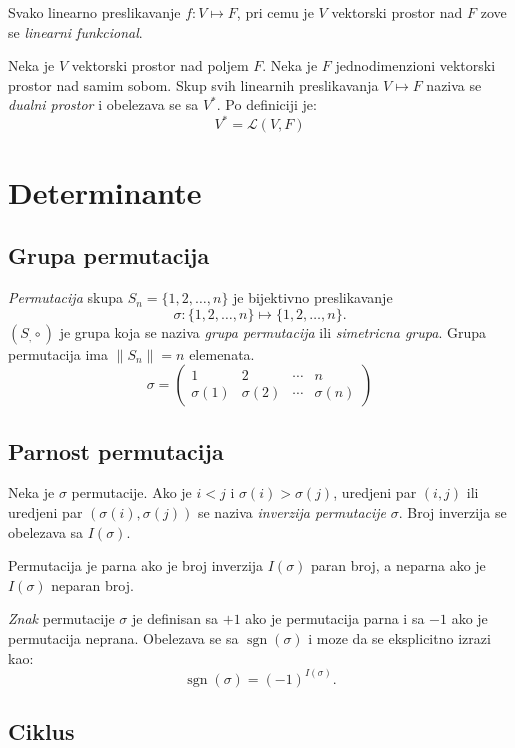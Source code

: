 \documentclass[12p,a4paper]{article}
\DeclareMathOperator{\sgn}{sgn}
\begin{document}
\begin{multicols}{2}
    Svako linearno preslikavanje $f : V \mapsto F$, pri cemu je $V$ vektorski 
    prostor nad $F$ zove se \textit{linearni funkcional}.

   Neka je $V$ vektorski prostor nad poljem $F$. Neka je $F$ jednodimenzioni 
   vektorski prostor nad samim sobom. Skup svih linearnih preslikavanja 
   $V \mapsto F$ naziva se \textit{dualni prostor} i obelezava se sa $V^*$. Po 
   definiciji je:
   \[V^* = \mathcal{L} (V, F)\]


\section{Determinante}

\subsection{Grupa permutacija}

    \textit{Permutacija} skupa $S_n = \{1, 2, \ldots, n\}$ je bijektivno 
    preslikavanje
    \[\sigma : \{1, 2, \ldots, n\} \mapsto \{1, 2, \ldots, n\}.\]
    $(S_, \circ)$ je grupa koja se naziva \textit{grupa permutacija} ili
    \textit{simetricna grupa}. Grupa permutacija ima $\| S_n \| = n$ 
    elemenata.
    \[
        \sigma = 
        \begin{pmatrix}
            1 & 2 & \cdots & n \\
            \sigma(1) & \sigma(2) & \cdots & \sigma(n)
        \end{pmatrix}
    \]

\subsection{Parnost permutacija}

    Neka je $\sigma$ permutacije. Ako je $i < j$ i $\sigma(i) > \sigma(j)$, 
    uredjeni par $(i, j)$ ili uredjeni par $(\sigma(i), \sigma(j))$ se naziva 
    \textit{inverzija permutacije} $\sigma$. Broj inverzija se obelezava sa 
    $I(\sigma)$.

    Permutacija je parna ako je broj inverzija $I(\sigma)$ paran broj, a 
    neparna ako je $I(\sigma)$ neparan broj.

    \textit{Znak} permutacije $\sigma$ je definisan sa $+1$ ako je permutacija 
    parna i sa $-1$ ako je permutacija neprana. Obelezava se sa $\sgn(\sigma)$
    i moze da se eksplicitno izrazi kao:
    \[\sgn({\sigma}) = {(-1)}^{I(\sigma)}.\]

\subsection{Ciklus}


\end{multicols}
\end{document}
